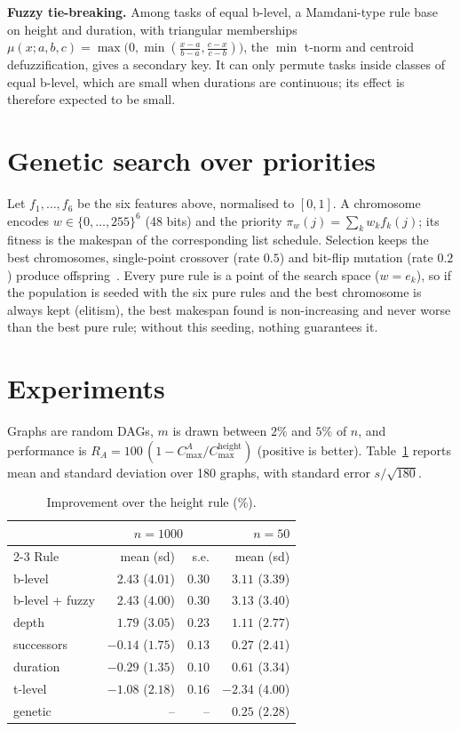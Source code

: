 \documentclass[10pt,twocolumn]{article}
\begin{document}
\textbf{Fuzzy tie-breaking.} Among tasks of equal b-level, a Mamdani-type rule base~\cite{zadeh1965} on height and duration, with triangular memberships $\mu(x;a,b,c)=\max\!\big(0,\min(\frac{x-a}{b-a},\frac{c-x}{c-b})\big)$, the $\min$ t-norm and centroid defuzzification, gives a secondary key. It can only permute tasks inside classes of equal b-level, which are small when durations are continuous; its effect is therefore expected to be small.

\section{Genetic search over priorities}
Let $f_1,\dots,f_6$ be the six features above, normalised to $[0,1]$. A chromosome encodes $w\in\{0,\dots,255\}^6$ (48 bits) and the priority $\pi_w(j)=\sum_kw_kf_k(j)$; its fitness is the makespan of the corresponding list schedule. Selection keeps the best chromosomes, single-point crossover (rate $0.5$) and bit-flip mutation (rate $0.2$) produce offspring~\cite{holland1975}. Every pure rule is a point of the search space ($w=e_k$), so if the population is seeded with the six pure rules and the best chromosome is always kept (elitism), the best makespan found is non-increasing and never worse than the best pure rule; without this seeding, nothing guarantees it.

\section{Experiments}
Graphs are random DAGs, $m$ is drawn between $2\%$ and $5\%$ of $n$, and performance is $R_A=100\,(1-C^A_{\max}/C^{\mathrm{height}}_{\max})$ (positive is better). Table~\ref{tab:res} reports mean and standard deviation over 180 graphs, with standard error $s/\sqrt{180}$.
\begin{table}[h]\centering\small
\begin{tabular}{lrrr}\toprule
& \multicolumn{2}{c}{$n=1000$} & $n=50$\\ \cmidrule(lr){2-3}
Rule & mean (sd) & s.e. & mean (sd)\\\midrule
b-level & $2.43$ ($4.01$) & $0.30$ & $3.11$ ($3.39$)\\
b-level + fuzzy & $2.43$ ($4.00$) & $0.30$ & $3.13$ ($3.40$)\\
depth & $1.79$ ($3.05$) & $0.23$ & $1.11$ ($2.77$)\\
successors & $-0.14$ ($1.75$) & $0.13$ & $0.27$ ($2.41$)\\
duration & $-0.29$ ($1.35$) & $0.10$ & $0.61$ ($3.34$)\\
t-level & $-1.08$ ($2.18$) & $0.16$ & $-2.34$ ($4.00$)\\
genetic & -- & -- & $0.25$ ($2.28$)\\\bottomrule
\end{tabular}
\caption{Improvement over the height rule (\%).}\label{tab:res}
\end{table}
\end{document}
